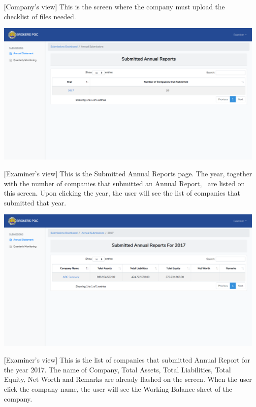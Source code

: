 \documentclass{article}
\begin{document}
[Company’s view] This is the screen where the company
must upload the checklist of files needed.%

\includegraphics[keepaspectratio=true]{up-ic-screens/image138}{}%

[Examiner’s view] This is the Submitted Annual
Reports page. The year, together with the number of companies that
submitted an Annual Report,  are listed on this screen. Upon clicking
the year, the user will see the list of companies that submitted that
year.%

\includegraphics[keepaspectratio=true]{up-ic-screens/image76}{}%

[Examiner’s view] This is the list of companies that
submitted Annual Report for the year 2017. The name of Company, Total
Assets, Total Liabilities, Total Equity, Net Worth and Remarks are
already flashed on the screen. When the user click the company name, the
user will see the Working Balance sheet of the company.%
\end{document}
